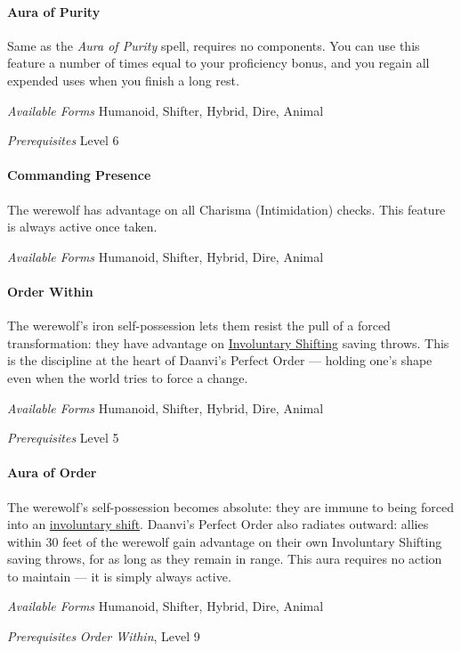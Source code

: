 \documentclass[twocolumn]{dndbook}
\begin{document}
\paragraph*{Aura of Purity}
Same as the \emph{Aura of Purity} spell, requires no components.
You can use this feature a number of times equal to your proficiency bonus, and you regain all expended uses when you finish a long rest.\par
\emph{Available Forms} Humanoid, Shifter, Hybrid, Dire, Animal\par
\emph{Prerequisites} Level 6\par

\paragraph*{Commanding Presence}
The werewolf has advantage on all Charisma (Intimidation) checks.
This feature is always active once taken.\par
\emph{Available Forms} Humanoid, Shifter, Hybrid, Dire, Animal\par

\paragraph*{Order Within}
The werewolf's iron self-possession lets them resist the pull of a forced transformation: they have advantage on \hyperref[sec:involuntary-shifting]{Involuntary Shifting} saving throws.
This is the discipline at the heart of Daanvi's Perfect Order --- holding one's shape even when the world tries to force a change.\par
\emph{Available Forms} Humanoid, Shifter, Hybrid, Dire, Animal\par
\emph{Prerequisites} Level 5\par

\paragraph*{Aura of Order}
The werewolf's self-possession becomes absolute: they are immune to being forced into an \hyperref[sec:involuntary-shifting]{involuntary shift}.
Daanvi's Perfect Order also radiates outward: allies within 30 feet of the werewolf gain advantage on their own Involuntary Shifting saving throws, for as long as they remain in range.
This aura requires no action to maintain --- it is simply always active.\par
\emph{Available Forms} Humanoid, Shifter, Hybrid, Dire, Animal\par
\emph{Prerequisites} \emph{Order Within}, Level 9\par
\end{document}
